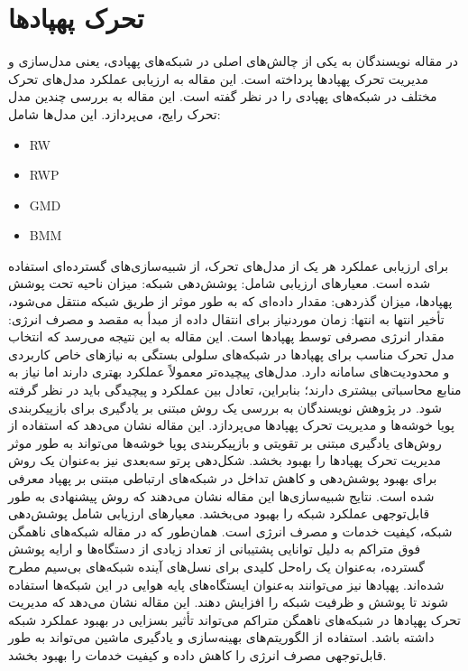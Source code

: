 \section{تحرک پهپادها}
در مقاله \cite{9078878} نویسندگان به یکی از چالش‌های اصلی در شبکه‌های پهپادی، یعنی مدل‌سازی و مدیریت تحرک پهپادها پرداخته است. این مقاله به ارزیابی عملکرد مدل‌های تحرک مختلف در شبکه‌های پهپادی را در نظر گفته است.
این مقاله به بررسی چندین مدل تحرک رایج، می‌پردازد. این مدل‌ها شامل: 
\begin{itemize}
	\item \gls{RW}
	\item \gls{RWP}
	\item \gls{GMD}
	\item \gls{BMM}
\end{itemize}

برای ارزیابی عملکرد هر یک از مدل‌های تحرک، از شبیه‌سازی‌های گسترده‌ای استفاده شده است. معیارهای ارزیابی شامل: پوشش‌دهی شبکه: میزان ناحیه تحت پوشش پهپادها، میزان گذردهی: مقدار داده‌ای که به طور موثر از طریق شبکه منتقل می‌شود، تأخیر انتها به انتها: زمان موردنیاز برای انتقال داده از مبدأ به مقصد و مصرف انرژی: مقدار انرژی مصرفی توسط پهپادها است. این مقاله به این نتیجه می‌رسد که انتخاب مدل تحرک مناسب برای پهپادها در شبکه‌های سلولی بستگی به نیازهای خاص کاربردی و محدودیت‌های سامانه دارد. مدل‌های پیچیده‌تر معمولاً عملکرد بهتری دارند اما نیاز به منابع محاسباتی بیشتری دارند؛ بنابراین، تعادل بین عملکرد و پیچیدگی باید در نظر گرفته شود.
در پژوهش \cite{Meer2024} نویسندگان به بررسی یک روش مبتنی بر یادگیری برای بازپیکربندی پویا خوشه‌ها و مدیریت تحرک پهپادها می‌پردازد. این مقاله نشان می‌دهد که استفاده از روش‌های یادگیری مبتنی بر تقویتی و بازپیکربندی پویا خوشه‌ها می‌تواند به طور موثر مدیریت تحرک پهپادها را بهبود بخشد. شکل‌دهی پرتو سه‌بعدی نیز به‌عنوان یک روش برای بهبود پوشش‌دهی و کاهش تداخل در شبکه‌های ارتباطی مبتنی بر پهپاد معرفی شده است.
نتایج شبیه‌سازی‌ها این مقاله نشان می‌دهند که روش پیشنهادی به طور قابل‌توجهی عملکرد شبکه را بهبود می‌بخشد. معیارهای ارزیابی شامل پوشش‌دهی شبکه، کیفیت خدمات و مصرف انرژی است.
همان‌طور که در مقاله \cite{Alshaibani2022} شبکه‌های ناهمگن فوق متراکم به دلیل توانایی پشتیبانی از تعداد زیادی از دستگاه‌ها و ارایه پوشش گسترده، به‌عنوان یک راه‌حل کلیدی برای نسل‌های آینده شبکه‌های بی‌سیم مطرح شده‌اند. پهپادها نیز می‌توانند به‌عنوان ایستگاه‌های پایه هوایی در این شبکه‌ها استفاده شوند تا پوشش و ظرفیت شبکه را افزایش دهند. این مقاله نشان می‌دهد که مدیریت تحرک پهپادها در شبکه‌های ناهمگن متراکم می‌تواند تأثیر بسزایی در بهبود عملکرد شبکه داشته باشد. استفاده از الگوریتم‌های بهینه‌سازی و یادگیری ماشین می‌تواند به طور قابل‌توجهی مصرف انرژی را کاهش داده و کیفیت خدمات را بهبود بخشد.
